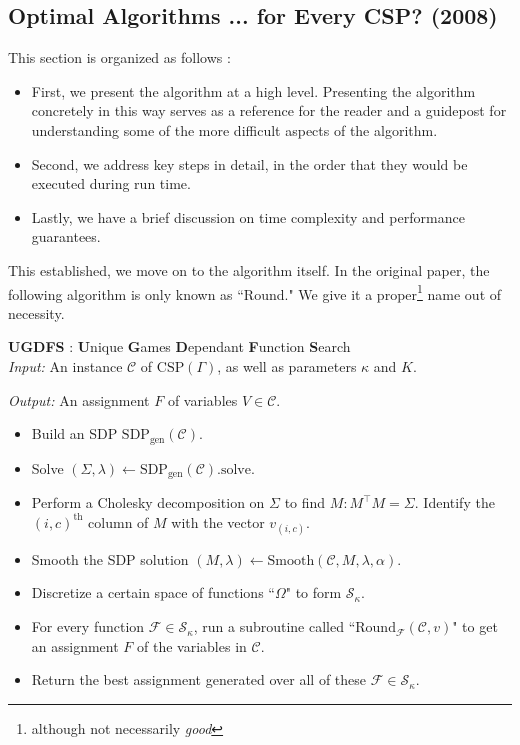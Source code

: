 \documentclass[letterpaper, 12pt]{article}
\numberwithin{equation}{section}
\begin{document}
\subsection{Optimal Algorithms ... for Every CSP? (2008)}
This section is organized as follows :
\begin{itemize}
\item First, we present the algorithm at a high level. Presenting the algorithm concretely in this way serves as a reference for the reader and a guidepost for understanding some of the more difficult aspects of the algorithm.
\item Second, we address key steps in detail, in the order that they would be executed during run time.
\item Lastly, we have a brief discussion on time complexity and performance guarantees.
\end{itemize}

This established, we move on to the algorithm itself. In the original paper, the following algorithm is only known as ``Round." We give it a proper\footnote{although not necessarily \textit{good}} name out of necessity.

\begin{algorithm} \textbf{UGDFS} : \textbf{U}nique \textbf{G}ames \textbf{D}ependant \textbf{F}unction \textbf{S}earch \\

\textit{Input: } An instance $\mathcal{C}$ of $\text{CSP}(\Gamma)$, as well as parameters $\kappa$ and $K$.

\textit{Output: } An assignment $F$ of variables $V \in \mathcal{C}$.
\begin{itemize}
\item Build an SDP $\text{SDP}_{\text{gen}}(\mathcal{C})$.
\item Solve $(\Sigma,\lambda) \leftarrow \text{SDP}_{\text{gen}}(\mathcal{C}).\text{solve}$.
\item Perform a Cholesky decomposition on $\Sigma$ to find $M : M^\intercal M = \Sigma$. Identify the $(i,c)^{\text{th}}$ column of $M$ with the vector $v_{(i,c)}$.
\item Smooth the SDP solution $(M,\lambda) \leftarrow \text{Smooth}(\mathcal{C},M,\lambda, \alpha)$.
\item Discretize a certain space of functions ``$\Omega$" to form $\mathcal{S}_{\kappa}$.
\item For every function $\mathcal{F} \in \mathcal{S}_{\kappa}$, run a subroutine called ``$\text{Round}_{\mathcal{F}}(\mathcal{C},v)$" to get an assignment $F$ of the variables in $\mathcal{C}$. 
\item Return the best assignment generated over all of these $\mathcal{F} \in \mathcal{S}_{\kappa}$.
\end{itemize}
\end{algorithm}
\newpage
\end{document}
